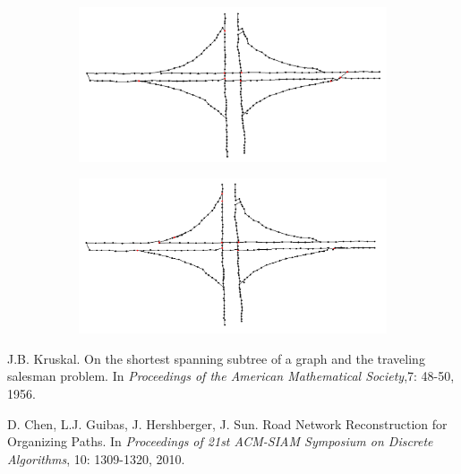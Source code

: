 \documentclass[11pt]{article}
\begin{document}
\begin{figure}[h]
\centering
  \begin{subfigure}{0.4\linewidth}
  \centering
  \graphicspath{ {images/}}
  \includegraphics[width=\linewidth]{knooppunt165_165}
  \end{subfigure}
    \begin{subfigure}{0.4\linewidth}
  \centering
  \graphicspath{ {images/}}
  \includegraphics[width=\linewidth]{knooppunt167_170}
  \end{subfigure}
\end{figure}



\begin{thebibliography}{}

J.B. Kruskal.
On the shortest spanning subtree of a graph and the traveling salesman problem.
In \emph{Proceedings of the American Mathematical Society},7: 48-50, 1956.

D. Chen, L.J. Guibas, J. Hershberger, J. Sun.
Road Network Reconstruction for Organizing Paths.
In \emph{Proceedings  of  21st  ACM-SIAM  Symposium  on  Discrete  Algorithms}, 10: 1309-1320, 2010.
\end{thebibliography}
\end{document}
